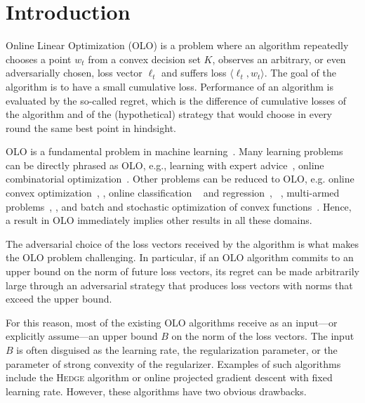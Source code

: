 \section{Introduction}
\label{section:introduction}

Online Linear Optimization (OLO) is a problem where an algorithm repeatedly
chooses a point $w_t$ from a convex decision set $K$, observes an arbitrary, or
even adversarially chosen, loss vector $\ell_t$ and suffers loss $\langle
\ell_t, w_t \rangle$.  The goal of the algorithm is to have a small cumulative
loss. Performance of an algorithm is evaluated by the so-called regret, which
is the difference of cumulative losses of the algorithm and of the
(hypothetical) strategy that would choose in every round the same best point in
hindsight.

OLO is a fundamental problem in machine
learning~\cite{Cesa-Bianchi-Lugosi-2006, Rakhlin-Sridharan-2009,
Shalev-Shwartz-2011}.  Many learning problems can be directly phrased as OLO,
e.g., learning with expert advice~\cite{Littlestone-Warmuth-1994, Vovk-1998,
Freund-Schapire-1997, Cesa-Bianchi-Haussler-Helmbold-Schapire-Warmuth-1997},
online combinatorial optimization~\cite{Kalai-Vempala-2005,
Helmbold-Warmuth-2009, Koolen-Warmuth-Kivinen-2010}. Other problems can be
reduced to OLO, e.g. online convex
optimization~\cite{Abernethy-Bartlett-Rakhlin-Tewari-2008},
\cite[Chapter~2]{Shalev-Shwartz-2011}, online classification
~\cite{Rosenblatt-1958,Freund-Schapire-1999} and
regression~\cite{Kivinen-Warmuth-1997},
~\cite[Chapters~11~and~12]{Cesa-Bianchi-Lugosi-2006}, multi-armed
problems~\cite[Chapter~6]{Cesa-Bianchi-Lugosi-2006},
\cite{Abernethy-Hazan-Rakhlin-2008, Bubeck-Cesa-Bianchi-2012}, and batch
and stochastic optimization of convex functions~\cite{Nemirovski-Yudin-1983,
Bubeck-2015}.  Hence, a result in OLO immediately implies other results in all
these domains.

The adversarial choice of the loss vectors received by the algorithm is what
makes the OLO problem challenging. In particular, if an OLO algorithm commits
to an upper bound on the norm of future loss vectors, its regret can be made
arbitrarily large through an adversarial strategy that produces loss vectors
with norms that exceed the upper bound.

For this reason, most of the existing OLO algorithms receive as an input---or
explicitly assume---an upper bound $B$ on the norm of the loss vectors.  The
input $B$ is often disguised as the learning rate, the regularization
parameter, or the parameter of strong convexity of the regularizer. Examples of
such algorithms include the \textsc{Hedge} algorithm or online projected
gradient descent with fixed learning rate.  However, these algorithms have two
obvious drawbacks.

